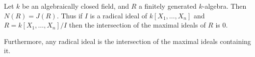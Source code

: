 Let $k$ be an algebraically closed field, and $R$ a finitely generated $k$-algebra.
Then $N(R) = J(R)$. Thus if $I$ is a radical ideal of $k[X_1, \ldots, X_n]$
and $R = k[X_1, \ldots, X_n]/I$ then the intersection of the maximal ideals of $R$
is $0$.

Furthermore, any radical ideal is the intersection of the maximal ideals containing
it.

